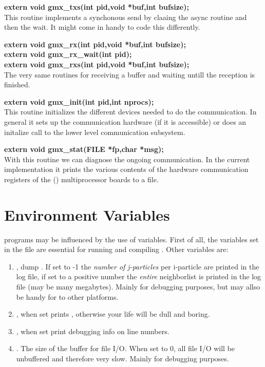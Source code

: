 {\bf extern void gmx\_txs(int pid,void *buf,int bufsize);}\\
This routine implements a synchonous send by claaing the async routine and then
the wait. It might come in handy to code this differently.

\smallskip

{\bf extern void gmx\_rx(int pid,void *buf,int bufsize);}\\
{\bf extern void gmx\_rx\_wait(int pid);}\\
{\bf extern void gmx\_rxs(int pid,void *buf,int bufsize);}\\
The very same routines for receiving a buffer and waiting untill the reception is finished.

\smallskip

{\bf extern void gmx\_init(int pid,int nprocs);}\\
This routine initializes the different devices needed to do the communication. In general it sets up the communication hardware (if it is accessible) or does an initalize call to the lower level communication subsystem.

\smallskip

{\bf extern void gmx\_stat(FILE *fp,char *msg);}\\
With this routine we can diagnose the ongoing communication. In the current implementation it prints the various contents of the hardware communication  registers of the (\intel) multiprocessor boards to a file.


\section{Environment Variables}
{\gromacs} programs may be influenced by the use of  
variables. First of all, the variables set in the  file
are essential for running and compiling {\gromacs}. Other variables are:
\begin{enumerate}
\item	{}, dump . 
	If set to -1 the {\em number of j-particles} per i-particle are printed
	in the log file, if set to a positive number the {\em entire}
	neighborlist is printed in the log file (may be many megabytes).
	Mainly for debugging purposes, but may allso be handy for
	 to other platforms.
\item	{}, when set prints , otherwise
	your {\gromacs} life will be dull and boring.
\item	{}, when set print debugging info on line numbers.
\item	{}. The size of the buffer for file I/O. When set
	to 0, all file I/O will be unbuffered and therefore very slow.
	Mainly for debugging purposes.
\end{enumerate}

